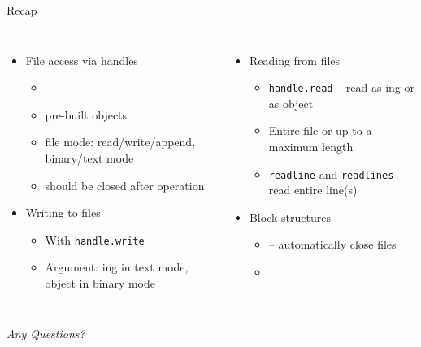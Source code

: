 
\begin{frame}[t,plain]
\titlepage
\end{frame}


\begin{frame}{Recap}
%
\begin{columns}[T]
\begin{itemize}
\item File access via handles
	\begin{itemize}
	\item {}
	\item pre-built objects
	\item file mode: read/write/append, binary/text mode
	\item should be closed after operation
	\end{itemize}
\item Writing to files
	\begin{itemize}
	\item With \texttt{handle.write}
	\item Argument: ing in text mode,  object in binary mode
	\end{itemize}
\end{itemize}
%
\begin{itemize}
\item Reading from files
	\begin{itemize}
	\item \texttt{handle.read} -- read as ing or as  object
	\item Entire file or up to a maximum length
	\item \texttt{readline} and \texttt{readlines} -- read entire line(s)
	\end{itemize}
\item Block structures
	\begin{itemize}
	\item {} -- automatically close files
	\item {}
	\end{itemize}
\end{itemize}
\end{columns}
%
\begin{center}
	\emph{Any Questions?}
\end{center}
%
\end{frame}

